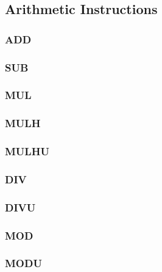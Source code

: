 \subsection{Arithmetic Instructions}

\subsubsection{ADD }\label{sec:ADD}

\subsubsection{SUB }\label{sec:SUB}
 
\subsubsection{MUL }\label{sec:MUL}

\subsubsection{MULH }\label{sec:MULH}

\subsubsection{MULHU }\label{sec:MULHU}

\subsubsection{DIV }\label{sec:DIV}

\subsubsection{DIVU }\label{sec:DIVU}

\subsubsection{MOD }\label{sec:MOD}

\subsubsection{MODU }\label{sec:MODU}